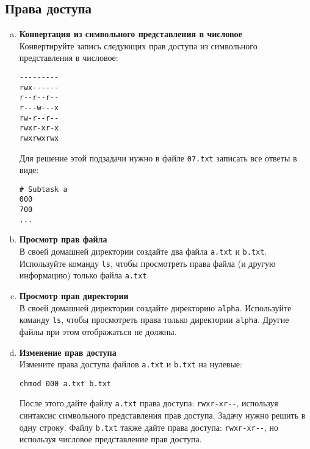 \documentclass{article}
\begin{document}
\subsection{Права доступа}
\begin{enumerate}[a.]
\item \textbf{Конвертация из символьного представления в числовое}\\
Конвертируйте запись следующих прав доступа из символьного представления в числовое:
\begin{lstlisting}
---------
rwx------
r--r--r--
r---w---x
rw-r--r--
rwxr-xr-x
rwxrwxrwx
\end{lstlisting}
Для решение этой подзадачи нужно в файле \texttt{07.txt} записать все ответы в виде:
\begin{lstlisting}
# Subtask a
000
700
...
\end{lstlisting}

\item \textbf{Просмотр прав файла}\\
В своей домашней директории создайте два файла \texttt{a.txt} и \texttt{b.txt}. Используйте команду \texttt{ls}, чтобы просмотреть права файла (и другую информацию) только файла \texttt{a.txt}.

\item \textbf{Просмотр прав директории}\\
В своей домашней директории создайте директорию \texttt{alpha}. Используйте команду \texttt{ls}, чтобы просмотреть права только директории \texttt{alpha}. Другие файлы при этом отображаться не должны.


\item \textbf{Изменение прав доступа}\\
Измените права доступа файлов \texttt{a.txt} и \texttt{b.txt} на нулевые:
\begin{lstlisting}
chmod 000 a.txt b.txt
\end{lstlisting}
После этого дайте файлу \texttt{a.txt} права доступа: \texttt{rwxr-xr-{}-}, используя синтаксис символьного представления прав доступа. Задачу нужно решить в одну строку.
Файлу \texttt{b.txt} также дайте права доступа: \texttt{rwxr-xr-{}-}, но используя числовое представление прав доступа. 


\end{enumerate}
\end{document}
